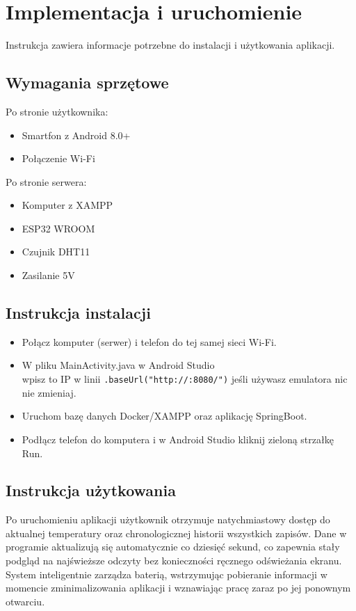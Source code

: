 \chapter{Implementacja i uruchomienie}
Instrukcja zawiera informacje potrzebne do instalacji i użytkowania aplikacji.

\section{Wymagania sprzętowe}
Po stronie użytkownika:
\begin{itemize}
	\item Smartfon z Android 8.0+
	\item Połączenie Wi-Fi \\
\end{itemize}

Po stronie serwera:
\begin{itemize}
	\item Komputer z XAMPP
	\item ESP32 WROOM
	\item Czujnik DHT11
	\item Zasilanie 5V
\end{itemize}

\section{Instrukcja instalacji}
\begin{itemize}
	\item Połącz komputer (serwer) i telefon do tej samej sieci Wi-Fi.
	\item W pliku MainActivity.java w Android Studio \\ wpisz to IP w linii \texttt{.baseUrl("http://:8080/")} jeśli używasz emulatora nic nie zmieniaj.
	\item Uruchom bazę danych Docker/XAMPP oraz aplikację SpringBoot.
	\item Podłącz telefon do komputera i w Android Studio kliknij zieloną strzałkę Run.
\end{itemize}

\section{Instrukcja użytkowania}
Po uruchomieniu aplikacji użytkownik otrzymuje natychmiastowy dostęp do aktualnej temperatury oraz chronologicznej historii wszystkich zapisów. Dane w programie aktualizują się automatycznie co dziesięć sekund, co zapewnia stały podgląd na najświeższe odczyty bez konieczności ręcznego odświeżania ekranu. System inteligentnie zarządza baterią, wstrzymując pobieranie informacji w momencie zminimalizowania aplikacji i wznawiając pracę zaraz po jej ponownym otwarciu.
